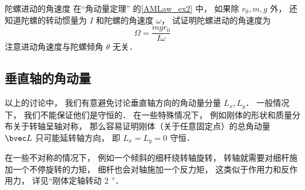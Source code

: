 \begin{exercise}{陀螺进动的角速度}\label{RigRot_exe1}
在“角动量定理” 的\autoref{AMLaw_ex2} 中， 如果除 $r_0, m, g$ 外， 还知道陀螺的转动惯量为 $I$ 和陀螺的角速度 $\omega$， 试证明陀螺进动的角速度为
\begin{equation}
\Omega = \frac{mgr_0}{I\omega}
\end{equation}
注意进动角速度与陀螺倾角 $\theta$ 无关．
\end{exercise}

\subsection{垂直轴的角动量}
以上的讨论中， 我们有意避免讨论垂直轴方向的角动量分量 $L_x, L_y$． 一般情况下， 我们不能保证他们是守恒的． 在一些特殊情况下， 例如刚体的形状和质量分布关于转轴呈轴对称， 那么容易证明刚体（关于任意固定点）的总角动量 $\bvec L$ 只可能延转轴方向， 即 $L_x = L_y = 0$ 守恒． %

在一些不对称的情况下， 例如一个倾斜的细杆绕转轴旋转， %
转轴就需要对细杆施加一个不停旋转的力矩， 细杆也会对轴施加一个反力矩， 这类似于作用力和反作用力， 详见“刚体定轴转动 2 ”．

